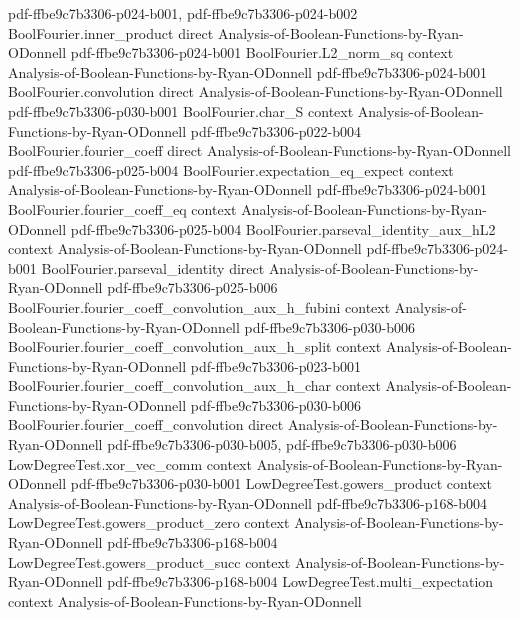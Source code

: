 \begin{lemma}
  {pdf-ffbe9c7b3306-p024-b001,
    pdf-ffbe9c7b3306-p024-b002}
\proofstep
  {BoolFourier.inner_product}
  {direct}
  {Analysis-of-Boolean-Functions-by-Ryan-ODonnell}
  {pdf-ffbe9c7b3306-p024-b001}
\proofstep
  {BoolFourier.L2_norm_sq}
  {context}
  {Analysis-of-Boolean-Functions-by-Ryan-ODonnell}
  {pdf-ffbe9c7b3306-p024-b001}
\proofstep
  {BoolFourier.convolution}
  {direct}
  {Analysis-of-Boolean-Functions-by-Ryan-ODonnell}
  {pdf-ffbe9c7b3306-p030-b001}
\proofstep
  {BoolFourier.char_S}
  {context}
  {Analysis-of-Boolean-Functions-by-Ryan-ODonnell}
  {pdf-ffbe9c7b3306-p022-b004}
\proofstep
  {BoolFourier.fourier_coeff}
  {direct}
  {Analysis-of-Boolean-Functions-by-Ryan-ODonnell}
  {pdf-ffbe9c7b3306-p025-b004}
\proofstep
  {BoolFourier.expectation_eq_expect}
  {context}
  {Analysis-of-Boolean-Functions-by-Ryan-ODonnell}
  {pdf-ffbe9c7b3306-p024-b001}
\proofstep
  {BoolFourier.fourier_coeff_eq}
  {context}
  {Analysis-of-Boolean-Functions-by-Ryan-ODonnell}
  {pdf-ffbe9c7b3306-p025-b004}
\proofstep
  {BoolFourier.parseval_identity_aux_hL2}
  {context}
  {Analysis-of-Boolean-Functions-by-Ryan-ODonnell}
  {pdf-ffbe9c7b3306-p024-b001}
\proofstep
  {BoolFourier.parseval_identity}
  {direct}
  {Analysis-of-Boolean-Functions-by-Ryan-ODonnell}
  {pdf-ffbe9c7b3306-p025-b006}
\proofstep
  {BoolFourier.fourier_coeff_convolution_aux_h_fubini}
  {context}
  {Analysis-of-Boolean-Functions-by-Ryan-ODonnell}
  {pdf-ffbe9c7b3306-p030-b006}
\proofstep
  {BoolFourier.fourier_coeff_convolution_aux_h_split}
  {context}
  {Analysis-of-Boolean-Functions-by-Ryan-ODonnell}
  {pdf-ffbe9c7b3306-p023-b001}
\proofstep
  {BoolFourier.fourier_coeff_convolution_aux_h_char}
  {context}
  {Analysis-of-Boolean-Functions-by-Ryan-ODonnell}
  {pdf-ffbe9c7b3306-p030-b006}
\proofstep
  {BoolFourier.fourier_coeff_convolution}
  {direct}
  {Analysis-of-Boolean-Functions-by-Ryan-ODonnell}
  {pdf-ffbe9c7b3306-p030-b005,
    pdf-ffbe9c7b3306-p030-b006}
\proofstep
  {LowDegreeTest.xor_vec_comm}
  {context}
  {Analysis-of-Boolean-Functions-by-Ryan-ODonnell}
  {pdf-ffbe9c7b3306-p030-b001}
\proofstep
  {LowDegreeTest.gowers_product}
  {context}
  {Analysis-of-Boolean-Functions-by-Ryan-ODonnell}
  {pdf-ffbe9c7b3306-p168-b004}
\proofstep
  {LowDegreeTest.gowers_product_zero}
  {context}
  {Analysis-of-Boolean-Functions-by-Ryan-ODonnell}
  {pdf-ffbe9c7b3306-p168-b004}
\proofstep
  {LowDegreeTest.gowers_product_succ}
  {context}
  {Analysis-of-Boolean-Functions-by-Ryan-ODonnell}
  {pdf-ffbe9c7b3306-p168-b004}
\proofstep
  {LowDegreeTest.multi_expectation}
  {context}
  {Analysis-of-Boolean-Functions-by-Ryan-ODonnell}

\end{lemma}
